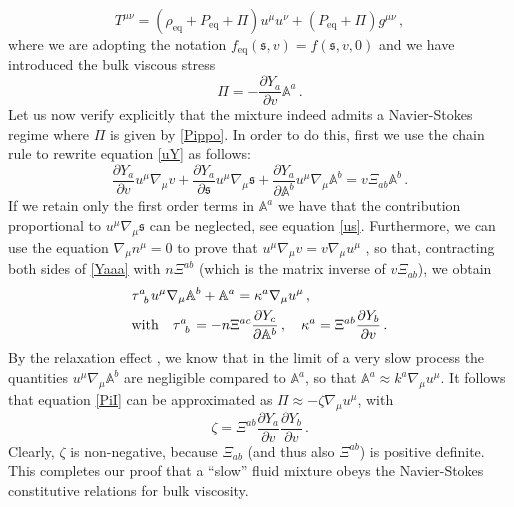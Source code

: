 \documentclass[a4paper, amsfonts, amssymb, amsmath, reprint, showkeys, nofootinbib, twoside, onecolumn,notitlepage]{revtex4-1}
\begin{document}
\begin{equation}
T^{\mu \nu} = (\rho_{\text{eq}}+P_{\text{eq}}+\Pi)u^\mu u^\nu +(P_{\text{eq}}+\Pi)g^{\mu \nu} \, ,
\end{equation}
where we are adopting the notation $f_{\text{eq}}(\mathfrak{s},v)= f(\mathfrak{s},v,0)$ and we have introduced the bulk viscous stress
\begin{equation}\label{PiI}
\Pi = -\dfrac{\partial Y_a}{\partial v} \mathbb{A}^a \, .
\end{equation}
Let us now verify explicitly that the mixture indeed admits a Navier-Stokes regime where $\Pi$ is given by \eqref{Pippo}. In order to do this, first we use the chain rule to rewrite equation \eqref{uY} as follows:
\begin{equation}\label{Yaaa}
\dfrac{\partial Y_a}{\partial v} u^\mu \nabla_\mu v + \dfrac{\partial Y_a}{\partial \mathfrak{s}} u^\mu \nabla_\mu \mathfrak{s} + \dfrac{\partial Y_a}{\partial \mathbb{A}^b} u^\mu \nabla_\mu \mathbb{A}^b = v\Xi_{ab}\mathbb{A}^b \, .
\end{equation}
If we retain only the first order terms in $\mathbb{A}^a$ we have that the contribution proportional to $u^\mu \nabla_\mu \mathfrak{s}$ can be neglected, see equation \eqref{us}. Furthermore, we can use the equation $\nabla_\mu n^\mu=0$ to prove that $u^\mu \nabla_\mu v=v\nabla_\mu u^\mu$ \cite{MTW_book}, so that, contracting both sides of \eqref{Yaaa} with $n\Xi^{ab}$ (which is the matrix inverse of $v\Xi_{ab}$), we obtain 
\begin{equation}\label{fourteen}
\begin{split}
& \tau\indices{^a_b} u^\mu \nabla_\mu \mathbb{A}^b + \mathbb{A}^a = \kappa^a \nabla_\mu u^\mu \, ,\\
& \text{with} \quad \tau\indices{^a_b} =-n\Xi^{ac}\dfrac{\partial Y_c}{\partial \mathbb{A}^b} \, , \quad \kappa^a=\Xi^{ab}\dfrac{\partial Y_b}{\partial v} \, . \\
\end{split}
\end{equation}
By the relaxation effect \cite{LindblomRelaxation1996}, we know that in the limit of a very slow process the quantities $u^\mu \nabla_\mu \mathbb{A}^b$ are negligible compared to $\mathbb{A}^a$, so that $\mathbb{A}^a \approx k^a\nabla_\mu u^\mu$. It follows that equation \eqref{PiI} can be approximated as $\Pi \approx -\zeta \nabla_\mu u^\mu$, with
\begin{equation}\label{zetuzza}
\zeta = \Xi^{ab} \dfrac{\partial Y_a}{\partial v}\dfrac{\partial Y_b}{\partial v} \, .
\end{equation}
Clearly, $\zeta$ is non-negative, because $\Xi_{ab}$ (and thus also $\Xi^{ab}$) is positive definite. This completes our proof that a ``slow'' fluid mixture obeys the Navier-Stokes constitutive relations for bulk viscosity.
\end{document}
